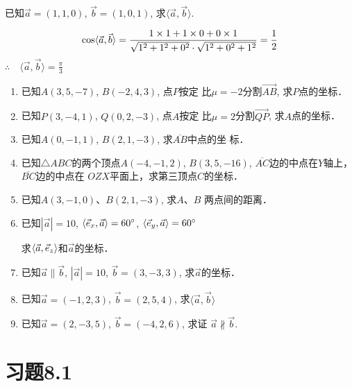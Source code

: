 \begin{example}
    已知$\vec{a}=(1,1,0)$, $\vec{b}=(1,0,1)$, 
求$\langle \vec{a},\vec{b}\rangle$.
\end{example}

\begin{solution}
\[\cos\langle \vec{a},\vec{b} \rangle=\dfrac{1\times 1+1\times 0+0\times 1}{\sqrt{1^2+1^2+0^2}\cdot \sqrt{1^2+0^2+1^2}}=\dfrac{1}{2} \]
$\therefore\quad \langle \vec{a},\vec{b}\rangle=\frac{\pi}{3}$    
\end{solution}

\begin{ex}
\begin{enumerate}
    \item 已知$A(3,5,-7)$, $B(-2,4,3)$, 点$P$按定
    比$\mu=-2$分割$\Vec{AB}$, 求$P$点的坐标．
    \item 已知$P(3,-4,1)$, $Q(0,2,-3)$, 点$A$按定
    比$\mu=2$分割$\Vec{QP}$, 求$A$点的坐标．
    \item 已知$A(0,-1,1)$, $B(2,1,-3)$, 求$\overline{AB}$中点的坐
    标．
    \item 已知$\triangle ABC$的两个顶点$A(-4,-1,2)$, $B(3,
    5,-16)$, $\overline{AC}$边的中点在$Y$轴上，
    $\overline{BC}$边的中点在
    $OZX$平面上，求第三顶点$C$的坐标．
    \item 已知$A(3,-1,0)$、$B(2,1,-3)$, 求$A$、$B$
    两点间的距离．
    \item 已知$|\vec{a}|=10$, $\langle \vec{e}_x,\vec{a} \rangle=60^{\circ}$, $\langle \vec{e}_y,\vec{a} \rangle=60^{\circ}$

    求$\langle \vec{a},\vec{e}_z \rangle$和$\vec{a}$的坐标．
\item 已知$\vec{a}\parallel \vec{b}$, $|\vec{a}|=10$, $\vec{b}=(3,-3,3)$, 求$\vec{a}$的坐标．

\item 已知$\vec{a}=(-1,2,3)$, $\vec{b}=(2,5,4)$, 求$\langle \vec{a},\vec{b} \rangle$

\item 已知$\vec{a}=(2,-3,5)$, $\vec{b}=(-4,2,6)$, 求证
$\vec{a}\nparallel \vec{b}$.
\end{enumerate}
\end{ex}

\section*{习题8.1}

